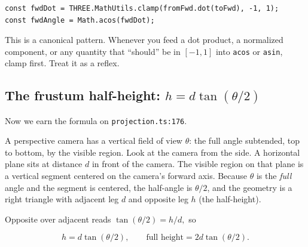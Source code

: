 \documentclass{article}
\begin{document}
\begin{lstlisting}
const fwdDot = THREE.MathUtils.clamp(fromFwd.dot(toFwd), -1, 1);
const fwdAngle = Math.acos(fwdDot);
\end{lstlisting}

This is a canonical pattern. Whenever you feed a dot product, a normalized
component, or any quantity that ``should'' be in $[-1,1]$ into \lstinline{acos}
or \lstinline{asin}, clamp first. Treat it as a reflex.

\subsection{The frustum half-height: $h = d \tan(\theta/2)$}

Now we earn the formula on \texttt{projection.ts:176}.

A perspective camera has a vertical field of view $\theta$: the full angle
subtended, top to bottom, by the visible region. Look at the camera from the
side. A horizontal plane sits at distance $d$ in front of the camera. The
visible region on that plane is a vertical segment centered on the camera's
forward axis. Because $\theta$ is the \emph{full} angle and the segment is
centered, the half-angle is $\theta/2$, and the geometry is a right triangle
with adjacent leg $d$ and opposite leg $h$ (the half-height).

\begin{center}
\end{center}

Opposite over adjacent reads
\(
  \tan(\theta/2) = h/d,
\)
so

\[
  h = d \tan(\theta/2), \qquad \text{full height} = 2 d \tan(\theta/2).
\]
\end{document}
